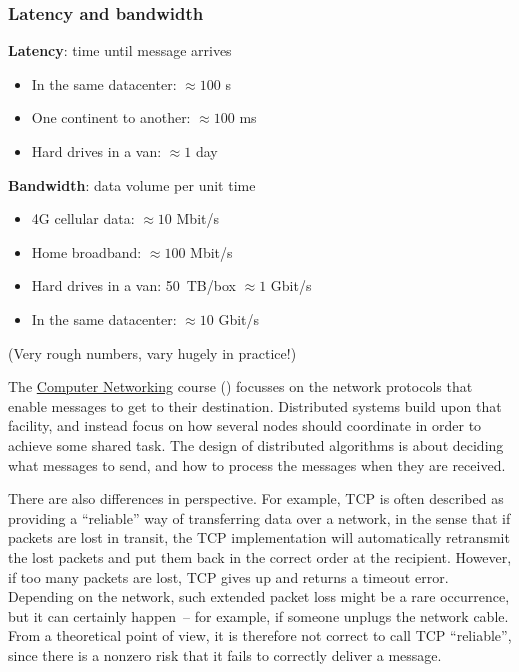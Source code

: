\begin{frame}
    \label{s:latency-bandwidth}
    \frametitle{Latency and bandwidth}
    \textbf{Latency}: time until message arrives
    \begin{itemize}
        \item In the same datacenter: $\approx 100$ {\textmu}s
        \item One continent to another: $\approx 100$ ms
        \item Hard drives in a van: $\approx 1$ day\\[2em]
    \end{itemize}\pause
    \textbf{Bandwidth}: data volume per unit time
    \begin{itemize}
        \item 4G cellular data: $\approx 10$ Mbit/s
        \item Home broadband: $\approx 100$ Mbit/s
        \item Hard drives in a van: 50~TB/box $\approx 1$ Gbit/s
        \item In the same datacenter: $\approx 10$ Gbit/s\\[1em]
    \end{itemize}
    (Very rough numbers, vary hugely in practice!)
\end{frame}

The \href{\networking}{Computer Networking} course (\whenisnetworking) focusses on the network protocols that enable messages to get to their destination.
Distributed systems build upon that facility, and instead focus on how several nodes should coordinate in order to achieve some shared task.
The design of distributed algorithms is about deciding what messages to send, and how to process the messages when they are received.

There are also differences in perspective.
For example, TCP is often described as providing a ``reliable'' way of transferring data over a network, in the sense that if packets are lost in transit, the TCP implementation will automatically retransmit the lost packets and put them back in the correct order at the recipient.
However, if too many packets are lost, TCP gives up and returns a timeout error.
Depending on the network, such extended packet loss might be a rare occurrence, but it can certainly happen~-- for example, if someone unplugs the network cable.
From a theoretical point of view, it is therefore not correct to call TCP ``reliable'', since there is a nonzero risk that it fails to correctly deliver a message.

